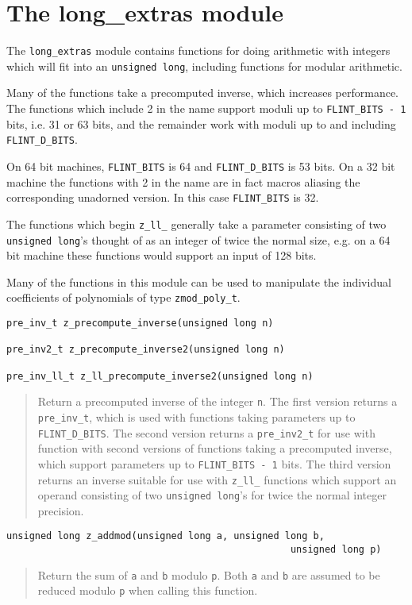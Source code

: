 \documentclass[a4paper,10pt]{article}
\newcommand{\code}{\lstinline}
\begin{document}
\section{The long\_extras module}
The \code{long_extras} module contains functions for doing arithmetic with integers which will fit into an \code{unsigned long}, including functions for modular arithmetic.

Many of the functions take a precomputed inverse, which increases performance. The functions which include 2 in the name support moduli up to \code{FLINT_BITS - 1} bits, i.e. 31 or 63 bits, and the remainder work with moduli up to and including \code{FLINT_D_BITS}. 

On 64 bit machines, \code{FLINT_BITS} is 64 and \code{FLINT_D_BITS} is 53 bits. On a 32 bit machine the functions with 2 in the name are in fact macros aliasing the corresponding unadorned version. In this case \code{FLINT_BITS} is 32.

The functions which begin \code{z_ll_} generally take a parameter consisting of two \code{unsigned long}'s thought of as an integer of twice the normal size, e.g. on a 64 bit machine these functions would support an input of 128 bits.

Many of the functions in this module can be used to manipulate the individual coefficients of polynomials of type \code{zmod_poly_t}.

\begin{lstlisting}
pre_inv_t z_precompute_inverse(unsigned long n)

pre_inv2_t z_precompute_inverse2(unsigned long n)

pre_inv_ll_t z_ll_precompute_inverse2(unsigned long n)
\end{lstlisting}
\begin{quote}
Return a precomputed inverse of the integer \code{n}. The first version returns a \code{pre_inv_t}, which is used with functions taking parameters up to \code{FLINT_D_BITS}. The second version returns a \code{pre_inv2_t} for use with function with second versions of functions taking a precomputed inverse, which support parameters up to \code{FLINT_BITS - 1} bits. The third version returns an inverse suitable for use with \code{z_ll_} functions which support an operand consisting of two \code{unsigned long}'s for twice the normal integer precision.
\end{quote}

\begin{lstlisting}
unsigned long z_addmod(unsigned long a, unsigned long b, 
                                                  unsigned long p)
\end{lstlisting}
\begin{quote}
Return the sum of \code{a} and \code{b} modulo \code{p}. Both \code{a} and \code{b} are assumed to be reduced modulo \code{p} when calling this function. 
\end{quote}
\end{document}
